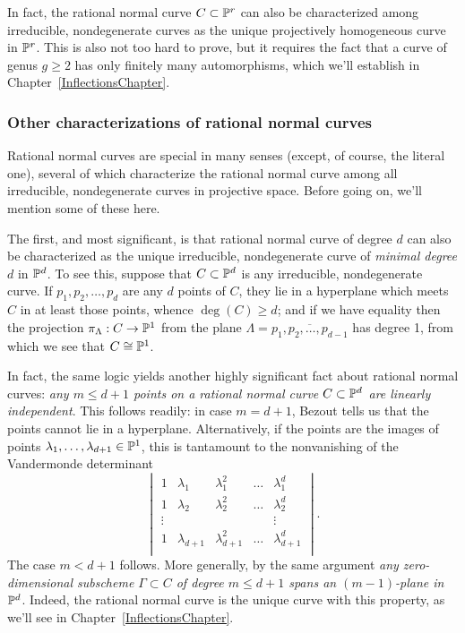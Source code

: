 In fact, the rational normal curve $C \subset \PP^r$ can also be characterized among irreducible, nondegenerate curves as the unique projectively homogeneous curve in $\PP^r$.  This is also not too hard to prove, but it requires the fact that a curve of genus $g \geq 2$ has only finitely many automorphisms, which we'll establish in Chapter~\ref{InflectionsChapter}.


\subsubsection{Other characterizations of rational normal curves}

Rational normal curves are special in many senses (except, of course, the literal one), several of which characterize the rational normal curve among all irreducible, nondegenerate curves in projective space. Before going on, we'll mention some of these here.


The first, and most significant, is that  rational normal curve of degree $d$ can also be characterized as the unique irreducible, nondegenerate curve of \emph{minimal degree} $d$ in $\PP^d$. To see this, suppose that $C \subset \PP^d$ is any irreducible, nondegenerate curve. If $p_1,p_2,\dots,p_{d}$ are any $d$ points of $C$, they lie in a hyperplane which meets $C$ in at least those points, whence $\deg(C) \geq d$; and if we have equality then the projection $\pi_\Lambda : C \to \PP^1$ from the plane $\Lambda = \overline{p_1,p_2,\dots,p_{d-1}}$ has degree 1, from which we see that $C \cong \PP^1$.

In fact, the same logic yields another highly significant fact about rational normal curves: \emph{any $m \leq d+1$ points on a rational normal curve $C \subset \PP^d$ are linearly independent}. This follows readily: in case $m=d+1$, Bezout tells us that the points cannot lie in a hyperplane. Alternatively, if the points are the images of points $\lambda_1,\dots,\lambda_{d+1} \in \PP^1$, this is tantamount to the nonvanishing of the Vandermonde determinant
$$
\begin{vmatrix}
1 & \lambda_1 & \lambda_1^2 & \dots & \lambda_1^d \\
1 & \lambda_2 & \lambda_2^2 & \dots & \lambda_2^d \\
\vdots & & & & \vdots \\
1 & \lambda_{d+1} & \lambda_{d+1}^2 & \dots & \lambda_{d+1}^d \\
\end{vmatrix}.
$$
The case $m < d+1$ follows. More generally, by the same argument \emph{any zero-dimensional subscheme $\Gamma \subset C$ of degree $m \leq d+1$ spans an $(m-1)$-plane in $\PP^d$}. Indeed, the rational normal curve is the unique curve with this property, as we'll see in Chapter~\ref{InflectionsChapter}.

